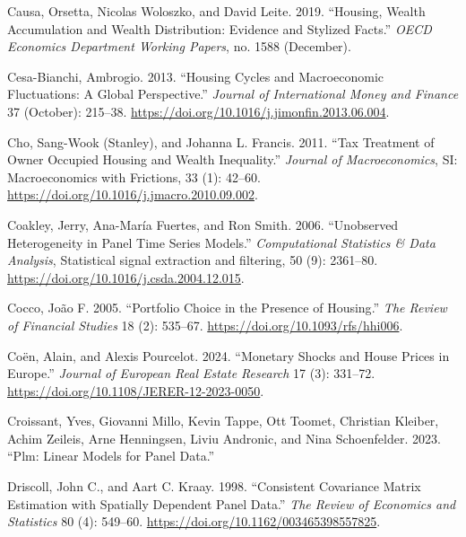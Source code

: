 \documentclass[
  a4paper,
  DIV=11,
  numbers=noendperiod]{scrartcl}
\newlength{\cslhangindent}
\newenvironment{CSLReferences}[2] %
 {\begin{list}{}{%
  \setlength{\itemindent}{0pt}
  \setlength{\leftmargin}{0pt}
  \setlength{\parsep}{0pt}
  \ifodd #1
   \setlength{\leftmargin}{\cslhangindent}
   \setlength{\itemindent}{-1\cslhangindent}
  \fi
  \setlength{\itemsep}{#2\baselineskip}}}
 {\end{list}}
\begin{document}
\begin{CSLReferences}{1}{0}
Causa, Orsetta, Nicolas Woloszko, and David Leite. 2019. {``Housing,
Wealth Accumulation and Wealth Distribution: {Evidence} and Stylized
Facts.''} \emph{OECD Economics Department Working Papers}, no. 1588
(December).

Cesa-Bianchi, Ambrogio. 2013. {``Housing Cycles and Macroeconomic
Fluctuations: {A} Global Perspective.''} \emph{Journal of International
Money and Finance} 37 (October): 215--38.
\url{https://doi.org/10.1016/j.jimonfin.2013.06.004}.

Cho, Sang-Wook (Stanley), and Johanna L. Francis. 2011. {``Tax Treatment
of Owner Occupied Housing and Wealth Inequality.''} \emph{Journal of
Macroeconomics}, {SI}: {Macroeconomics} with {Frictions}, 33 (1):
42--60. \url{https://doi.org/10.1016/j.jmacro.2010.09.002}.

Coakley, Jerry, Ana-María Fuertes, and Ron Smith. 2006. {``Unobserved
Heterogeneity in Panel Time Series Models.''} \emph{Computational
Statistics \& Data Analysis}, Statistical signal extraction and
filtering, 50 (9): 2361--80.
\url{https://doi.org/10.1016/j.csda.2004.12.015}.

Cocco, João F. 2005. {``Portfolio {Choice} in the {Presence} of
{Housing}.''} \emph{The Review of Financial Studies} 18 (2): 535--67.
\url{https://doi.org/10.1093/rfs/hhi006}.

Coën, Alain, and Alexis Pourcelot. 2024. {``Monetary Shocks and House
Prices in {Europe}.''} \emph{Journal of European Real Estate Research}
17 (3): 331--72. \url{https://doi.org/10.1108/JERER-12-2023-0050}.

Croissant, Yves, Giovanni Millo, Kevin Tappe, Ott Toomet, Christian
Kleiber, Achim Zeileis, Arne Henningsen, Liviu Andronic, and Nina
Schoenfelder. 2023. {``Plm: {Linear Models} for {Panel Data}.''}

Driscoll, John C., and Aart C. Kraay. 1998. {``Consistent {Covariance
Matrix Estimation} with {Spatially Dependent Panel Data}.''} \emph{The
Review of Economics and Statistics} 80 (4): 549--60.
\url{https://doi.org/10.1162/003465398557825}.


\end{CSLReferences}
\end{document}
